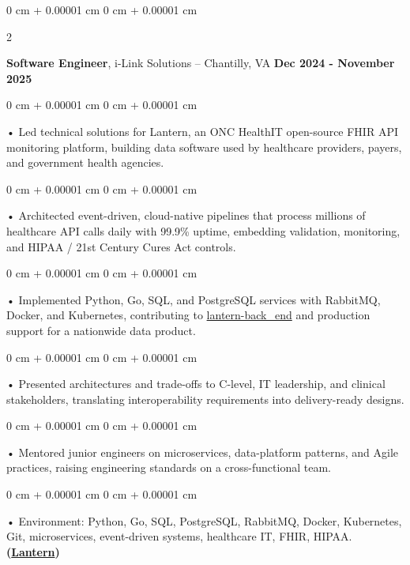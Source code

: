 \documentclass[10pt, letterpaper]{article}
\newenvironment{onecolentry}{
    \begin{adjustwidth}{
        0 cm + 0.00001 cm
    }{
        0 cm + 0.00001 cm
    }
}{
    \end{adjustwidth}
} %
\newenvironment{twocolentry}[2][]{
    \onecolentry
    \def\secondColumn{#2}
    \setcolumnwidth{\fill, 4.5 cm}
    \begin{paracol}{2}
}{
    \switchcolumn \raggedleft \secondColumn
    \end{paracol}
    \endonecolentry
} %
\begin{document}
        \vspace{0.1cm}

        \begin{twocolentry}{
            \textbf{Dec 2024 - November 2025}
        }
            \textbf{Software Engineer}, i-Link Solutions -- Chantilly, VA\end{twocolentry}


        \begin{onecolentry}
             • Led technical solutions for Lantern, an ONC HealthIT open-source FHIR API monitoring platform, building data software used by healthcare providers, payers, and government health agencies.
        \end{onecolentry}
        \begin{onecolentry}
             • Architected event-driven, cloud-native pipelines that process millions of healthcare API calls daily with 99.9\% uptime, embedding validation, monitoring, and HIPAA / 21st Century Cures Act controls.
        \end{onecolentry}
        \begin{onecolentry}
             • Implemented Python, Go, SQL, and PostgreSQL services with RabbitMQ, Docker, and Kubernetes, contributing to \href{https://github.com/onc-healthit/lantern-back-end}{lantern-back\_end} and production support for a nationwide data product.
        \end{onecolentry}
        \begin{onecolentry}
             • Presented architectures and trade-offs to C-level, IT leadership, and clinical stakeholders, translating interoperability requirements into delivery-ready designs.
        \end{onecolentry}
        \begin{onecolentry}
             • Mentored junior engineers on microservices, data-platform patterns, and Agile practices, raising engineering standards on a cross-functional team.
        \end{onecolentry}

        \begin{onecolentry}
             • Environment: Python, Go, SQL, PostgreSQL, RabbitMQ, Docker, Kubernetes, Git, microservices, event-driven systems, healthcare IT, FHIR, HIPAA.\textbf{(\href{https://lantern.healthit.gov/?tab=dashboard_tab}{Lantern})}
        \end{onecolentry}
        \vspace{0.1cm}
\end{document}
